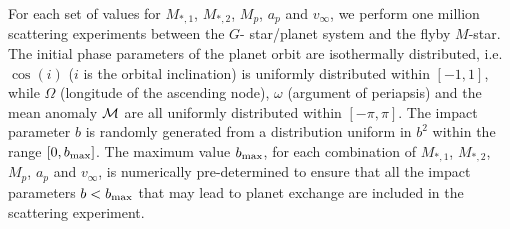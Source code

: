 \documentclass[twocolumn]{aastex62}
\begin{document}
For each set of values for $M_{*,1}$, $M_{*,2}$, $M_p$, $a_p$ and $v_\infty$, we perform 
one million scattering experiments between the $G$- star/planet system and the flyby $M$-star. The initial phase parameters of the planet orbit are isothermally distributed, i.e. $\cos(i)$ 
($i$ is the orbital inclination)
is uniformly distributed within $[-1,1]$, while $\Omega$ (longitude of the ascending node), $\omega$ (argument of periapsis) and 
 the mean anomaly $\cal{M}$ 
are all uniformly distributed within $[-\pi, \pi]$.
 The impact parameter $b$ is randomly generated from a distribution uniform in
 $b^2$  within the range $[0, b_{\rm max}]$. The maximum value $b_{\rm max}$, for each combination of  $M_{*,1}$, $M_{*,2}$, $M_p$, $a_p$ and $v_\infty$, is numerically pre-determined to ensure that all the impact parameters $b<b_{\rm max}$ that may lead to planet exchange are included in the scattering experiment.  
\end{document}

